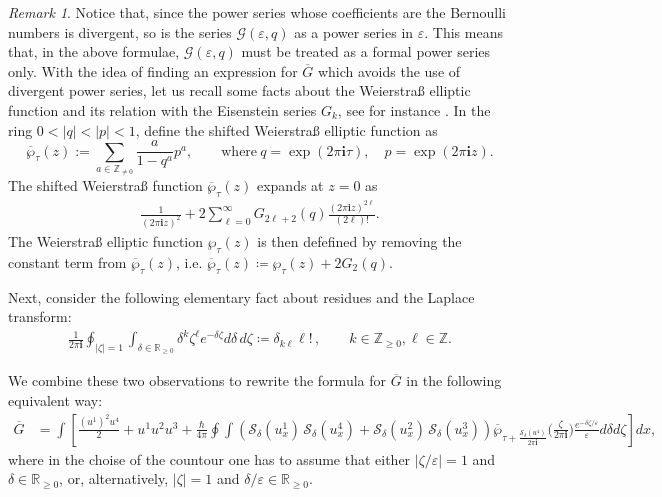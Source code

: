 \documentclass{amsart}
\numberwithin{equation}{section} %
\theoremstyle{plain}
\theoremstyle{remark}
\newtheorem{remark}[theorem]{Remark}
\def\cxi{\mathbf{i}}
\begin{document}
\begin{remark} Notice that, since the power series whose coefficients are the Bernoulli numbers is divergent, so is the series $\mathcal{G}(\varepsilon,q)$ as a power series in $\varepsilon$. This means that, in the above formulae, $\mathcal{G}(\varepsilon,q)$ must be treated as a formal power series only. With the idea of finding an expression for $\overline{G}$ which avoids the use of divergent power series, let us recall some facts about the Weierstra\ss{} elliptic function and its relation with the Eisenstein series $G_k$, see for instance \cite{pixton_oberdieck_18}. In the ring $0<|q|<|p|<1$, define the shifted Weierstra\ss{} elliptic function as
$$\overline{\wp}_\tau(z):=\sum_{a\in \mathbb{Z}_{\not= 0}} \frac{a}{1-q^a} p^a ,\qquad \text{where}\ q=\exp(2\pi\cxi \tau),\quad p=\exp(2\pi\cxi z).$$
The shifted Weierstra\ss{} function $\overline{\wp}_\tau(z)$ expands at $z=0$ as 
	\begin{align*} \label{eq:wp-expansion}
		\frac 1{(2\pi\cxi z)^2} + 2 \sum_{\ell=0}^\infty G_{2\ell+2}(q) \frac{(2\pi\cxi z)^{2\ell}}{(2\ell)!}.		
	\end{align*}
The Weierstra\ss{} elliptic function $\wp_\tau(z)$ is then defefined by removing the constant term from $\overline{\wp}_{\tau}(z)$, i.e. $\overline{\wp}_\tau(z)\coloneqq {\wp}_\tau(z) + 2G_2(q)$. %

Next, consider the following elementary fact about residues and the Laplace transform:
\begin{align*}
\frac{1}{2\pi\cxi}  \oint_{|\zeta|=1} \int_{\delta\in\mathbb{R}_{\geq 0}} \delta^k\zeta^\ell e^{-\delta\zeta} d\delta\, d\zeta \coloneqq \delta_{k\ell} \ell! \, , \qquad k\in \mathbb{Z}_{\geq 0}, \ell \in \mathbb{Z}.
\end{align*}

We combine these two observations to rewrite the formula for $\overline{G}$ in the following equivalent way: 
\begin{align*}
\overline{G}& =  \int \left[ \frac{(u^1)^2 u^4}{2} + u^1 u^2 u^3 + \frac{\hbar}{4\pi} \oint\!\!\int
\left(\mathcal{S}_{\delta} ( u^1_x) \,\mathcal{S}_{\delta}( u^4_x) +\mathcal{S}_{\delta}( u^2_x)\,\mathcal{S}_{\delta}( u^3_x)\right) \overline{\wp}_{\tau+\frac{\mathcal{S}_{\delta} (u^4)}{2\pi\cxi}}\Big(\frac{\zeta}{2\pi\cxi}\Big) \frac{e^{-\delta\zeta /\varepsilon}}{\varepsilon}	d\delta d\zeta \right]dx,
\end{align*}
where in the choise of the countour one has to assume that either $|\zeta/\varepsilon|=1$ and $\delta \in \mathbb{R}_{\geq 0}$, or, alternatively, $|\zeta|=1$ and $\delta/\varepsilon \in \mathbb{R}_{\geq 0}$.


\end{remark}
\end{document}
